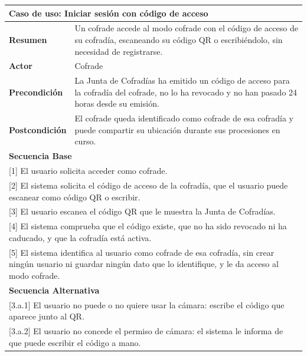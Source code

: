 \begin{table}[h!]
    \centering
    \renewcommand{\arraystretch}{1.5}

    \begin{tabular}{|p{4cm}|p{11cm}|}
        \hline
        \multicolumn{2}{|l|}{\textbf{Caso de uso: Iniciar sesión con código de acceso}} \\
        \hline
        \textbf{Resumen} & Un cofrade accede al modo cofrade con el código de acceso de su cofradía, escaneando su código QR o escribiéndolo, sin necesidad de registrarse. \\
        \hline
        \textbf{Actor} & Cofrade \\
        \hline
        \textbf{Precondición} & La Junta de Cofradías ha emitido un código de acceso para la cofradía del cofrade, no lo ha revocado y no han pasado 24 horas desde su emisión. \\
        \hline
        \textbf{Postcondición} & El cofrade queda identificado como cofrade de esa cofradía y puede compartir su ubicación durante sus procesiones en curso. \\
        \hline
        \multicolumn{2}{|l|}{\textbf{Secuencia Base}} \\
        \hline
        \multicolumn{2}{|p{15cm}|}{ [1] El usuario solicita acceder como cofrade. } \\
        \hline
        \multicolumn{2}{|p{15cm}|}{ [2] El sistema solicita el código de acceso de la cofradía, que el usuario puede escanear como código QR o escribir. } \\
        \hline
        \multicolumn{2}{|p{15cm}|}{ [3] El usuario escanea el código QR que le muestra la Junta de Cofradías. } \\
        \hline
        \multicolumn{2}{|p{15cm}|}{ [4] El sistema comprueba que el código existe, que no ha sido revocado ni ha caducado, y que la cofradía está activa. } \\
        \hline
        \multicolumn{2}{|p{15cm}|}{ [5] El sistema identifica al usuario como cofrade de esa cofradía, sin crear ningún usuario ni guardar ningún dato que lo identifique, y le da acceso al modo cofrade. } \\
        \hline
        \multicolumn{2}{|l|}{\textbf{Secuencia Alternativa}} \\
        \hline
        \multicolumn{2}{|p{15cm}|}{ [3.a.1] El usuario no puede o no quiere usar la cámara: escribe el código que aparece junto al QR. } \\
        \hline
        \multicolumn{2}{|p{15cm}|}{ [3.a.2] El usuario no concede el permiso de cámara: el sistema le informa de que puede escribir el código a mano. } \\

\end{tabular}
\end{table}

